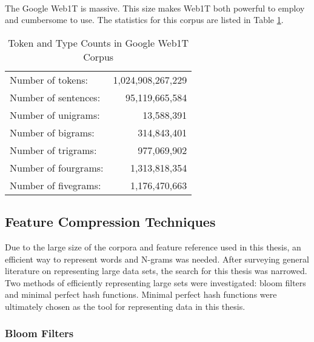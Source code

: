 		\paragraph{} The Google Web1T is massive.  This size makes Web1T both powerful to employ and cumbersome to use. The statistics for this corpus are listed in Table \ref{table:GoogleWeb1T}.
		\begin{center}	
			\begin{table}[h]

				\begin{center}
					\begin{tabular}{ l r }
						Number of tokens: & 1,024,908,267,229\\
						Number of sentences: & 95,119,665,584\\
						Number of unigrams: & 13,588,391\\
						Number of bigrams: & 314,843,401\\
						Number of trigrams: & 977,069,902\\
						Number of fourgrams: & 1,313,818,354\\
						Number of fivegrams: & 1,176,470,663\\
					\end{tabular}
				\caption{Token and Type Counts in Google Web1T Corpus}
				\label{table:GoogleWeb1T}
				\end{center}
			\end{table}
		\end{center}

	\subsection {Feature Compression Techniques} Due to the large size of the corpora and feature reference used in this thesis, an efficient way to represent words and N-grams was needed.  After surveying general literature on representing large data sets, the search for this thesis was narrowed.  Two methods of efficiently representing large sets were investigated: bloom filters and minimal perfect hash functions.  Minimal perfect hash functions were ultimately chosen as the tool for representing data in this thesis.

		\subsubsection{Bloom Filters}

